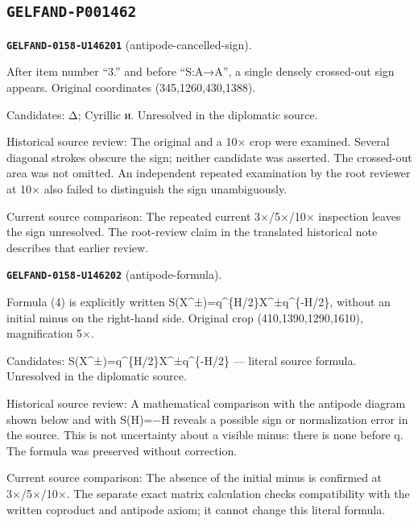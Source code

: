 \subsection*{\texttt{GELFAND-P001462}}
\par\noindent\leavevmode{}\label{GELFAND-0158-U146201}\label{GELFAND-P001462:antipode-cancelled-sign}\textbf{\texttt{GELFAND-0158-U146201}} (antipode-cancelled-sign).\nopagebreak[4]\par
After item number “3.” and before “S:A→A”, a single densely crossed-out sign appears. Original coordinates (345,1260,430,1388).\par
Candidates: Δ; Cyrillic и. Unresolved in the diplomatic source.\par
Historical source review: The original and a 10× crop were examined. Several diagonal strokes obscure the sign; neither candidate was asserted. The crossed-out area was not omitted. An independent repeated examination by the root reviewer at 10× also failed to distinguish the sign unambiguously.\par
Current source comparison: The repeated current 3×/5×/10× inspection leaves the sign unresolved. The root-review claim in the translated historical note describes that earlier review.\par\medskip
\par\noindent\leavevmode{}\label{GELFAND-0158-U146202}\label{GELFAND-P001462:antipode-formula}\textbf{\texttt{GELFAND-0158-U146202}} (antipode-formula).\nopagebreak[4]\par
Formula (4) is explicitly written S(X\textasciicircum{}±)=q\textasciicircum{}\{H/2\}X\textasciicircum{}±q\textasciicircum{}\{-H/2\}, without an initial minus on the right-hand side. Original crop (410,1390,1290,1610), magnification 5×.\par
Candidates: S(X\textasciicircum{}±)=q\textasciicircum{}\{H/2\}X\textasciicircum{}±q\textasciicircum{}\{-H/2\} — literal source formula. Unresolved in the diplomatic source.\par
Historical source review: A mathematical comparison with the antipode diagram shown below and with S(H)=−H reveals a possible sign or normalization error in the source. This is not uncertainty about a visible minus: there is none before q. The formula was preserved without correction.\par
Current source comparison: The absence of the initial minus is confirmed at 3×/5×/10×. The separate exact matrix calculation checks compatibility with the written coproduct and antipode axiom; it cannot change this literal formula.\par\medskip
